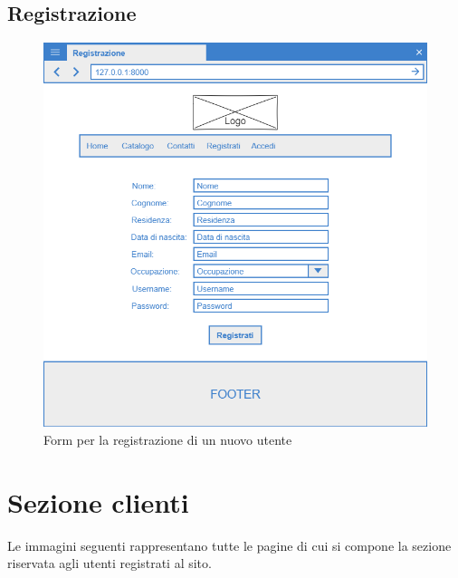 \documentclass[12pt,a4paperS]{report}
\begin{document}
\begin{normalsize}
			\subsection{Registrazione}
				\begin{figure}[H]
					\centering
					\includegraphics[width=1\textwidth, height=1\textheight, keepaspectratio]{Mockup/Registrazione.png}
					\caption{Form per la registrazione di un nuovo utente}
				\end{figure}
		
		\newpage
		\section{Sezione clienti}
			Le immagini seguenti rappresentano tutte le pagine di cui si compone la sezione riservata agli utenti registrati al sito.
			

\end{normalsize}
\end{document}
